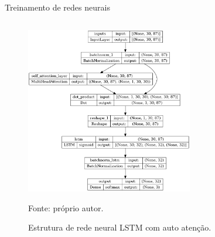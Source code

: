 \begin{frame}{Treinamento de redes neurais}
\begin{columns}
\begin{column}{0.5\textwidth}
                \begin{figure}[htp]
                    \centering
                    \caption{Estrutura de rede neural LSTM com auto atenção.}
                    \label{fig:model_lstm_SelfAtt}
                    \includegraphics[width=0.65\textwidth]{./images/lstm_selfatt.png}
                    \par \footnotesize Fonte: próprio autor.
                \end{figure}

            \end{column}
        \end{columns}

        
    \end{frame}




